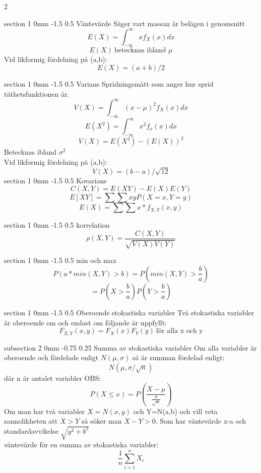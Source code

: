 \documentclass[a4paper,11pt]{article}
\makeatletter
\renewcommand{\section}{\@startsection
   {section}%
   {1}%
   {0mm}%
   {-1.5\baselineskip}%
   {0.5\baselineskip}%
   {\sffamily\bfseries\upshape\normalsize}}%
\renewcommand{\subsection}{\@startsection
   {subsection}%
   {2}%
   {0mm}%
   {-0.75\baselineskip}%
   {0.25\baselineskip}%
   {\rmfamily\normalfont\slshape\normalsize}}%
\makeatother
\begin{document}
\begin{multicols}{2}
 
 \section{Väntevärde}
 Säger vart massan är belägen i genomsnitt
 $$E(X)=\int_{-\infty}^{\infty}xf_X(x)dx$$
 $$E(X) \ \text{betecknas ibland } \mu$$
 Vid likformig fördelning på (a,b):
 $$E(X)=(a+b)/2$$
 
 \section{Varians}
Spridningsmått som anger hur sprid täthetsfunktionen är.
$$V(X)=\int_{-\infty}^{\infty}(x-\mu)^2f_X(x)dx$$
$$E(X^2)=\int_{-\infty}^{\infty}x^2f_x{(x)dx}$$
$$V(X)=E(X^2)-(E(X))^2$$
Betecknas ibland $\sigma^2$\\
Vid likformig fördelning på (a,b):
$$V(X)=(b-a)/\sqrt{12}$$
\section{Kovarians}
$$C(X,Y)=E(XY)-E(X)E(Y)$$
$$E[XY]=\sum \sum xyP(X=x,Y=y)$$
$$E(X)=\sum \sum x*f_{X,Y}(x,y)$$

\section{korrelation}
$$\rho(X,Y)=\frac{C(X,Y)}{\sqrt{V(X)V(Y)}}$$

\section{min och max}
$$P(a*min(X,Y)>b)=P(min(X,Y)>\frac{b}{a})$$
$$=P(X>\frac{b}{a})P(Y>\frac{b}{a})$$

 \section{Oberoende stokastiska variabler}
 Två stokastiska variabler är oberoende om och endast om följande är uppfyllt:
 $$F_{X,Y}(x,y)=F_X(x)F_Y(y) \ \text{för alla x och y}$$
 
 \subsection{Summa av stokastiska variabler} Om alla variabler är oberoende och fördelade enligt $N(\mu,\sigma)$ så är summan fördelad enligt:
 $$N(\mu,\sigma/\sqrt{n})$$
 där n är antalet variabler
 OBS:
 $$P(X\leq x)=P(\frac{X-\mu}{\frac{\sigma}{ \sqrt{n}}})$$
 Om man har två variabler $X=N(x,y)$ och Y=N(a,b) och vill veta sannolikheten att $X>Y$
 så söker man $X-Y>0$. Som har väntevärde x-a och standardavvikelse $\sqrt{y^2+b^2}$
 \\
 väntevärde för en summa av stokastiska variabler:
 $$\frac{1}{n} \sum_{i=1}^{n}{X_i}$$

\end{multicols}
\end{document}
